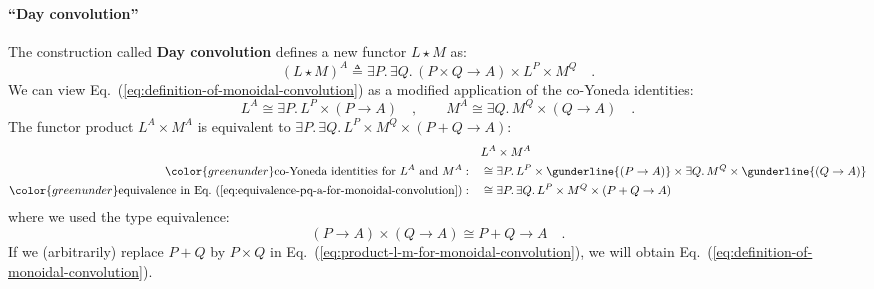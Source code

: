\paragraph{\textquotedblleft Day convolution\textquotedblright}

The construction called \textbf{Day convolution}
defines a new functor $L\star M$ as:
\begin{equation}
\left(L\star M\right)^{A}\triangleq\exists P.\,\exists Q.\,\left(P\times Q\rightarrow A\right)\times L^{P}\times M^{Q}\quad.\label{eq:definition-of-monoidal-convolution}
\end{equation}
We can view Eq.~(\ref{eq:definition-of-monoidal-convolution}) as
a modified application of the co-Yoneda identities:
\[
L^{A}\cong\exists P.\,L^{P}\times\left(P\rightarrow A\right)\quad,\quad\quad M^{A}\cong\exists Q.\,M^{Q}\times\left(Q\rightarrow A\right)\quad.
\]
The functor product $L^{A}\times M^{A}$ is equivalent to $\exists P.\,\exists Q.\,L^{P}\times M^{Q}\times\left(P+Q\rightarrow A\right)$:
\begin{align}
 & L^{A}\times M^{A}\nonumber \\
{\color{greenunder}\text{co-Yoneda identities for }L^{A}\text{ and }M^{A}:}\quad & \cong\exists P.\,L^{P}\times\gunderline{\left(P\rightarrow A\right)}\times\exists Q.\,M^{Q}\times\gunderline{\left(Q\rightarrow A\right)}\nonumber \\
{\color{greenunder}\text{equivalence in Eq.~(\ref{eq:equivalence-pq-a-for-monoidal-convolution})}:}\quad & \cong\exists P.\,\exists Q.\,L^{P}\times M^{Q}\times\left(P+Q\rightarrow A\right)\label{eq:product-l-m-for-monoidal-convolution}
\end{align}
where we used the type equivalence:
\begin{equation}
\left(P\rightarrow A\right)\times\left(Q\rightarrow A\right)\cong P+Q\rightarrow A\quad.\label{eq:equivalence-pq-a-for-monoidal-convolution}
\end{equation}
If we (arbitrarily) replace $P+Q$ by $P\times Q$ in Eq.~(\ref{eq:product-l-m-for-monoidal-convolution}),
we will obtain Eq.~(\ref{eq:definition-of-monoidal-convolution}).

